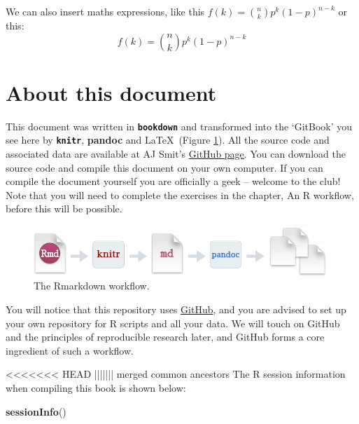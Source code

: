 \documentclass[]{book}
\newenvironment{Shaded}{\begin{snugshade}}{\end{snugshade}}
\newcommand{\KeywordTok}[1]{\textcolor[rgb]{0.13,0.29,0.53}{\textbf{#1}}}
\newcommand{\NormalTok}[1]{#1}
\theoremstyle{definition}
\theoremstyle{definition}
\theoremstyle{definition}
\theoremstyle{remark}
\begin{document}
We can also insert maths expressions, like this
\(f(k) = {n \choose k} p^{k} (1-p)^{n-k}\) or this:
\[f(k) = {n \choose k} p^{k} (1-p)^{n-k}\]

\section{About this document}\label{about-this-document}

This document was written in \textbf{\texttt{bookdown}} and transformed
into the `GitBook' you see here by \textbf{\texttt{knitr}},
\textbf{pandoc} and \LaTeX~(Figure \ref{fig:rmarkdown}). All the source
code and associated data are available at AJ Smit's
\href{https://github.com/ajsmit/Intro_R_Workshop}{GitHub page}. You can
download the source code and compile this document on your own computer.
If you can compile the document yourself you are officially a geek --
welcome to the club! Note that you will need to complete the exercises
in the chapter, An R workflow, before this will be possible.

\begin{figure}

{\centering \includegraphics[width=1\linewidth]{figures/RMarkdownFlow} 

}

\caption{The Rmarkdown workflow.}\label{fig:rmarkdown}
\end{figure}

You will notice that this repository uses
\href{https://github.com}{GitHub}, and you are advised to set up your
own repository for R scripts and all your data. We will touch on GitHub
and the principles of reproducible research later, and GitHub forms a
core ingredient of such a workflow.

<<<<<<< HEAD
||||||| merged common ancestors
The R session information when compiling this book is shown below:

\begin{Shaded}
\begin{Highlighting}[]
\KeywordTok{sessionInfo}\NormalTok{()}
\end{Highlighting}
\end{Shaded}
\end{document}
